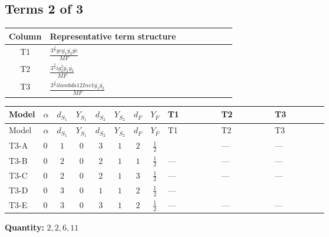 \documentclass[8pt]{article}
\begin{document}
\begin{landscape}
\subsection*{Terms 2 of 3}
\begin{center}
\begin{tabular}{@{}c >{\raggedright\arraybackslash}p{0.82\linewidth}@{}}
\toprule
Column & Representative term structure \\
\midrule
T1 & \(\displaystyle \frac{3^{\frac{3}{4}} ye \overline{y_{1}} \overline{y_{2}} \overline{ye}}{MF}\) \\
\midrule
T2 & \(\displaystyle \frac{3^{\frac{3}{4}} i g_{2}^{2} \overline{y_{1}} \overline{y_{2}}}{MF}\) \\
\midrule
T3 & \(\displaystyle \frac{3^{\frac{3}{4}} i lambda12Inv1 \overline{y_{1}} \overline{y_{2}}}{MF}\) \\
\midrule
\bottomrule
\end{tabular}
\end{center}
\smallskip
\tiny
\begin{longtable}{@{}llcccccc >{\raggedright\arraybackslash}p{0.21\linewidth} >{\raggedright\arraybackslash}p{0.21\linewidth} >{\raggedright\arraybackslash}p{0.21\linewidth}@{}}
\toprule
Model & $\alpha$ & $d_{S_1}$ & $Y_{S_1}$ & $d_{S_2}$ & $Y_{S_2}$ & $d_F$ & $Y_F$ & T1 & T2 & T3 \\
\midrule
\endfirsthead
\toprule
Model & $\alpha$ & $d_{S_1}$ & $Y_{S_1}$ & $d_{S_2}$ & $Y_{S_2}$ & $d_F$ & $Y_F$ & T1 & T2 & T3 \\
\midrule
\endhead
T3-A & $0$ & $1$ & $0$ & $3$ & $1$ & $2$ & $\frac{1}{2}$ & \scriptsize\adjustbox{max width=\linewidth}{$\begin{gathered} \frac{3^{\frac{3}{4}} ye \overline{y_{1}} \overline{y_{2}} \overline{ye}}{12 MF}\end{gathered}$} & --- & --- \\
\midrule
T3-B & $0$ & $2$ & $0$ & $2$ & $1$ & $1$ & $\frac{1}{2}$ & --- & --- & --- \\
\midrule
T3-C & $0$ & $2$ & $0$ & $2$ & $1$ & $3$ & $\frac{1}{2}$ & --- & --- & --- \\
\midrule
T3-D & $0$ & $3$ & $0$ & $1$ & $1$ & $2$ & $\frac{1}{2}$ & --- & \scriptsize\adjustbox{max width=\linewidth}{$\begin{gathered} - \frac{11 \cdot 3^{\frac{3}{4}} i g_{2}^{2} \overline{y_{1}} \overline{y_{2}}}{8 MF}\end{gathered}$} & \scriptsize\adjustbox{max width=\linewidth}{$\begin{gathered} - \frac{3^{\frac{3}{4}} i lambda12Inv1 \overline{y_{1}} \overline{y_{2}}}{6 MF}\end{gathered}$} \\
\midrule
T3-E & $0$ & $3$ & $0$ & $3$ & $1$ & $2$ & $\frac{1}{2}$ & --- & --- & --- \\
\midrule
\bottomrule
\end{longtable}
\clearpage
\noindent\textbf{Quantity: }$\mathrm{2,2,6,11}$\par\smallskip

\end{landscape}
\end{document}
